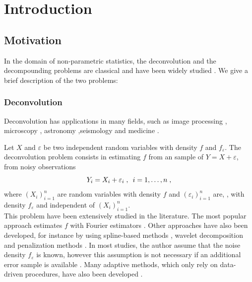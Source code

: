 

\section{Introduction}

\subsection{Motivation}
\label{part:introduction}
In the domain of non-parametric statistics, the deconvolution and the decompounding problems are classical and have been widely studied \cite{buchmann2003decompounding, duval2013density, duval2019adaptive, johannes2009deconvolution}.
We give a brief description of the two problems:

\subsubsection*{Deconvolution}
Deconvolution has applications in many fields, such as image processing \cite{kundur1996blind}, microscopy \cite{swedlow2007quantitative}, astronomy \cite{starck2002deconvolution, pantin2017deconvolution},seismology \cite{ulrych1971application, sacchi1997reweighting} and medicine \cite{liu2009deconvolution, ralston2005deconvolution}.

Let $X$ and $\varepsilon$ be two independent random variables with density $f$ and $f_\varepsilon$. The deconvolution problem consists in estimating $f$ from an \iid sample of $Y = X + \varepsilon$, \ie from noisy observations     
    \begin{equation*}
        Y_i = X_i + \varepsilon_i \; , \enspace
        i = 1, \ldots, n
        \; ,
    \end{equation*}
where $(X_i)_{i = 1}^n$ are \iid random variables with density $f$ and $(\varepsilon_i)_{i = 1}^n$ are, \iid, with density $f_\varepsilon$ and independent of $(X_i)_{i = 1}^n$. \\
This problem have been extensively studied in the literature. The most popular approach estimates $f$ with Fourier estimators \cite{carroll1988optimal, devroye1989consistent,stefanski1990deconvolving, neumann1997effect}. Other approaches have also been developed, for instance by using spline-based methods \cite{averbuch2009spline}, wavelet decomposition \cite{johnstone2004wavelet, starck2003wavelets} and penalization methods \cite{comte2006penalized, comte2007finite}. In most studies, the author assume that the noise density $f_\varepsilon$ is known, however this assumption is not necessary if an additional error sample is available \cite{johannes2009deconvolution, comte2011data}. Many adaptive methods, which only rely on data-driven procedures, have also been developed \cite{griffiths1977adaptive, duval2019adaptive}.
\\


